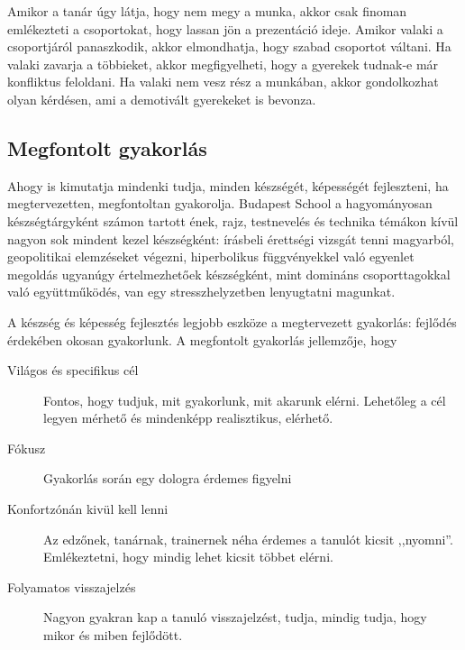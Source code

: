 Amikor a tanár úgy látja, hogy nem megy a munka, akkor csak finoman emlékezteti a csoportokat, hogy lassan jön a prezentáció ideje. Amikor valaki a csoportjáról panaszkodik, akkor elmondhatja, hogy szabad csoportot váltani. Ha valaki zavarja a többieket, akkor megfigyelheti, hogy a gyerekek tudnak-e már konfliktus feloldani. Ha valaki nem vesz rész a munkában, akkor gondolkozhat olyan kérdésen, ami a demotivált gyerekeket is bevonza.

\subsection{Megfontolt gyakorlás}
Ahogy \citep{ericsson2016peak} is kimutatja mindenki tudja, minden készségét, képességét fejleszteni, ha megtervezetten, megfontoltan gyakorolja. Budapest School a hagyományosan készségtárgyként számon tartott ének, rajz, testnevelés és technika témákon kívül nagyon sok mindent kezel készségként: írásbeli érettségi vizsgát tenni magyarból, geopolitikai elemzéseket végezni, hiperbolikus függvényekkel való egyenlet megoldás ugyanúgy értelmezhetőek készségként, mint domináns csoporttagokkal való együttműködés, van egy stresszhelyzetben lenyugtatni magunkat.

A készség és képesség fejlesztés legjobb eszköze a megtervezett gyakorlás: fejlődés érdekében okosan gyakorlunk. A megfontolt gyakorlás jellemzője, hogy

\begin{description}
  \item[Világos és specifikus cél] Fontos, hogy tudjuk, mit gyakorlunk, mit akarunk elérni.  Lehetőleg a cél legyen mérhető és mindenképp realisztikus, elérhető.
  \item[Fókusz] Gyakorlás során egy dologra érdemes figyelni
  \item[Konfortzónán kivül kell lenni] Az edzőnek, tanárnak, trainernek néha érdemes a tanulót kicsit ,,nyomni''. Emlékeztetni, hogy mindig lehet kicsit többet elérni.
  \item[Folyamatos visszajelzés] Nagyon gyakran kap a tanuló visszajelzést, tudja, mindig tudja, hogy mikor és miben fejlődött.
\end{description}
